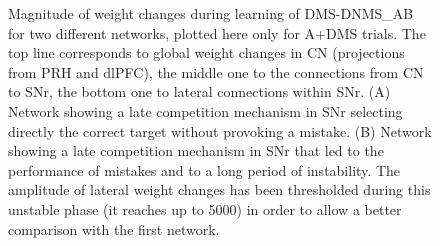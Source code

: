 \documentclass[
  11pt,
  a4paper,
]{scrbook}
\begin{document}
\begin{figure}


\caption{\label{fig-ficn:weightchange}Magnitude of weight changes during
learning of DMS-DNMS\_AB for two different networks, plotted here only
for A+DMS trials. The top line corresponds to global weight changes in
CN (projections from PRH and dlPFC), the middle one to the connections
from CN to SNr, the bottom one to lateral connections within SNr. (A)
Network showing a late competition mechanism in SNr selecting directly
the correct target without provoking a mistake. (B) Network showing a
late competition mechanism in SNr that led to the performance of
mistakes and to a long period of instability. The amplitude of lateral
weight changes has been thresholded during this unstable phase (it
reaches up to 5000) in order to allow a better comparison with the first
network.}

\end{figure}%
\end{document}
